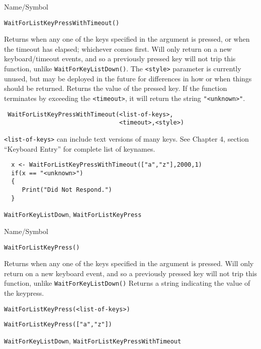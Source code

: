 \begin{desc}{Name/Symbol}
\item[Name/Symbol]  	\verb+WaitForListKeyPressWithTimeout()+

\item[Description] Returns when any one of the keys specified in the
  argument is pressed, or when the timeout has elapsed; whichever
  comes first. Will only return on a new keyboard/timeout events, and
  so a previously pressed key will not trip this function, unlike
  \verb+WaitForKeyListDown()+.  The \verb+<style>+ parameter is currently
  unused, but may be deployed in the future for differences in how
  or when things should be returned.  Returns the value of the pressed
  key.  If the function terminates by exceeding the \verb+<timeout>+,
  it will return the string \verb+"<unknown>"+.

\item[Usage]
\begin{verbatim}
 WaitForListKeyPressWithTimeout(<list-of-keys>,
                                <timeout>,<style>)
\end{verbatim}

\verb+<list-of-keys>+ can include text versions of many keys.  See Chapter 4,
section ``Keyboard Entry'' for complete list of keynames.

\item[Example]     	
\begin{verbatim}
  x <- WaitForListKeyPressWithTimeout(["a","z"],2000,1)
  if(x == "<unknown>") 
  {
     Print("Did Not Respond.")
  }
\end{verbatim}

\item[See Also]	
   \verb+WaitForKeyListDown+, \verb+WaitForListKeyPress+
 \end{desc}

\rl





\begin{desc}{Name/Symbol}
\item[Name/Symbol]  	\verb+WaitForListKeyPress()+

\item[Description] Returns when any one of the keys specified in the
  argument is pressed. Will only return on a new keyboard event, and
  so a previously pressed key will not trip this function, unlike
  \verb+WaitForKeyListDown()+  Returns a string indicating the value
  of the keypress.

\item[Usage]
\begin{verbatim}
WaitForListKeyPress(<list-of-keys>)
\end{verbatim}

\item[Example]     	
\begin{verbatim}
WaitForListKeyPress(["a","z"])
\end{verbatim}

\item[See Also]	
   \verb+WaitForKeyListDown+, \verb+WaitForListKeyPressWithTimeout+
 \end{desc}

